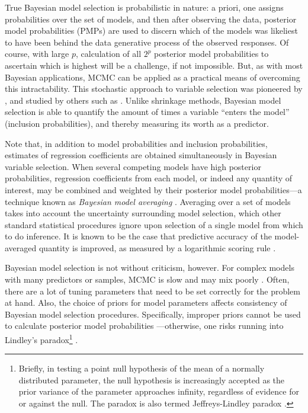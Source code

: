\documentclass[11pt,twoside,openright]{report}
\begin{document}
True Bayesian model selection is probabilistic in nature: a priori, one assigns probabilities over the set of models, and then after observing the data, posterior model probabilities (PMPs) are used to discern which of the models was likeliest to have been behind the data generative process of the observed responses.
Of course, with large  $p$, calculation of all $2^p$ posterior model probabilities to ascertain which is highest will be a challenge, if not impossible.
But, as with most Bayesian applications, MCMC can be applied as a practical means of overcoming this intractability.
This stochastic approach to variable selection was pioneered by \citet{George1993}, and studied by others such as \citet{Kuo1998,dellaportas2002bayesian,Ntzoufras2008}.
Unlike shrinkage methods, Bayesian model selection is able to quantify the amount of times a variable ``enters the model'' (inclusion probabilities), and thereby measuring its worth as a  predictor.

\thispagestyle{chaptersix}
Note that, in addition to model probabilities and inclusion probabilities, estimates of regression coefficients are obtained simultaneously in Bayesian variable selection.
When several competing models have high posterior probabilities, regression coefficients from each model, or indeed any quantity of interest, may be combined and weighted by their posterior model probabilities---a technique known as \emph{Bayesian model averaging} \citep{madigan1994model,hoeting1999bayesian}.
Averaging over a set of models takes into account the uncertainty surrounding model selection, which other standard statistical procedures ignore upon selection of a single model from which to do inference.
It is known to be the case that predictive accuracy of the model-averaged quantity is improved, as measured by a logarithmic scoring rule \citep{raftery1997bayesian}.

\label{errata18}
Bayesian model selection is not without criticism, however.
For complex models with many predictors or samples, MCMC is slow and may mix poorly \citep{OHara2009}.
Often, there are a lot of tuning parameters that need to be set correctly for the problem at hand.
Also, the choice of priors for model parameters affects consistency of Bayesian model selection procedures. 
Specifically, improper priors cannot be used to calculate posterior model probabilities \citep{casella2009consistency}---otherwise, one risks running into Lindley's paradox\footnote{Briefly, in testing a point null hypothesis of the mean of a normally distributed parameter, the null hypothesis is increasingly accepted as the prior variance of the parameter approaches infinity, regardless of evidence for or against the null.
The paradox is also termed Jeffreys-Lindley paradox \citep{robert2014jeffreys}.} \citep{lindley1957statistical}.
\end{document}

